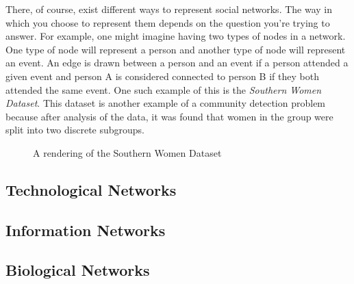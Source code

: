 There, of course, exist different ways to represent social networks. The way in which you choose to represent them depends on the question you're trying to answer. For example, one might imagine having two types of nodes in a network. One type of node will represent a person and another type of node will represent an event. An edge is drawn between a person and an event if a person attended a given event and person A is considered connected to person B if they both attended the same event. One such example of this is the \emph{Southern Women Dataset}.\cite{konect:southernwomen} This dataset is another example of a community detection problem because after analysis of the data, it was found that women in the group were split into two discrete subgroups.

\begin{figure}
    \begin{center}
    \end{center}
    \caption{A rendering of the Southern Women Dataset}
    \label{fig:southernwomen}
\end{figure}


\subsection{Technological Networks}\label{sec:Technological Networks}
\subsection{Information Networks}\label{sec:Information Networks}
\subsection{Biological Networks}\label{sec:Biological Networks}

